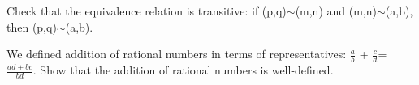 \documentclass[12pt,letterpaper,boxed]{hmcpset}
\begin{document}

\begin{problem}
Check that the equivalence relation is transitive: if (p,q)$\sim$(m,n) and (m,n)$\sim$(a,b), then (p,q)$\sim$(a,b).
\end{problem}


\begin{solution}

\end{solution}

\begin{problem}
We defined addition of rational numbers in terms of representatives: \(\frac{a}{b}\) + \(\frac{c}{d}\)= \(\frac{ad+bc}{bd}\). Show that the addition of rational numbers is well-defined.
\end{problem}

\begin{solution}

\end{solution}
\end{document}
